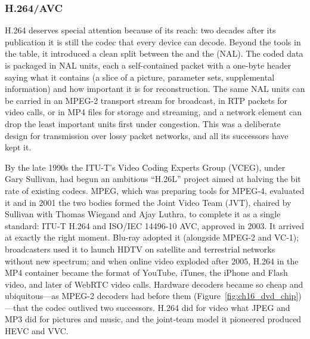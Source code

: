 
\subsubsection{H.264/AVC}

H.264 deserves special attention because of its reach: two decades after its publication it is still
the codec that every device can decode. Beyond the tools in the table, it introduced a clean split
between the  and the  (NAL). The coded data is
packaged in NAL units, each a self-contained packet with a one-byte header saying what it contains
(a slice of a picture, parameter sets, supplemental information) and how important it is for
reconstruction. The same NAL units can be carried in an MPEG-2 transport stream for broadcast, in RTP
packets for video calls, or in MP4 files for storage and streaming, and a network element can drop the
least important units first under congestion. This was a deliberate design for transmission over
lossy packet networks, and all its successors have kept it.

\begin{history}
By the late 1990s the ITU-T's Video Coding Experts Group (VCEG), under Gary Sullivan, had begun an
ambitious ``H.26L'' project aimed at halving the bit rate of existing codecs. MPEG, which was preparing
tools for MPEG-4, evaluated it and in 2001 the two bodies formed the Joint Video Team (JVT), chaired by
Sullivan with Thomas Wiegand and Ajay Luthra, to complete it as a single standard: ITU-T H.264 and
ISO/IEC 14496-10 AVC, approved in 2003. It arrived at exactly the right moment. Blu-ray adopted it
(alongside MPEG-2 and VC-1); broadcasters used it to launch HDTV on satellite and terrestrial networks
without new spectrum; and when online video exploded after 2005, H.264 in the MP4 container became the
format of YouTube, iTunes, the iPhone and Flash video, and later of WebRTC video calls. Hardware decoders
became so cheap and ubiquitous---as MPEG-2 decoders had before them (Figure~\ref{fig:ch16_dvd_chip})---that the codec outlived two successors. H.264 did for video what JPEG and
MP3 did for pictures and music, and the joint-team model it pioneered produced HEVC and VVC.
\end{history}

